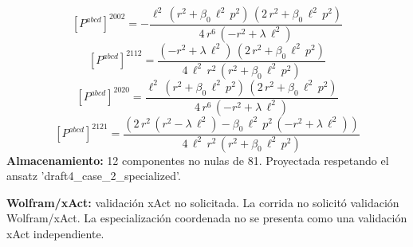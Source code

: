 \documentclass[11pt]{article}
\begin{document}
\begin{dmath*}[breakdepth={5}]
\left[P^{abcd}\right]^{2002} = -\frac{{\ell}^{2}\,\left({r}^{2} + \beta_{0}\,{\ell}^{2}\,{p}^{2}\right)\,\left(2\,{r}^{2} + \beta_{0}\,{\ell}^{2}\,{p}^{2}\right)}{4\,{r}^{6}\,\left(-{r}^{2} + \lambda\,{\ell}^{2}\right)}
\end{dmath*}
\begin{dmath*}[breakdepth={5}]
\left[P^{abcd}\right]^{2112} = \frac{\left(-{r}^{2} + \lambda\,{\ell}^{2}\right)\,\left(2\,{r}^{2} + \beta_{0}\,{\ell}^{2}\,{p}^{2}\right)}{4\,{\ell}^{2}\,{r}^{2}\,\left({r}^{2} + \beta_{0}\,{\ell}^{2}\,{p}^{2}\right)}
\end{dmath*}
\begin{dmath*}[breakdepth={5}]
\left[P^{abcd}\right]^{2020} = \frac{{\ell}^{2}\,\left({r}^{2} + \beta_{0}\,{\ell}^{2}\,{p}^{2}\right)\,\left(2\,{r}^{2} + \beta_{0}\,{\ell}^{2}\,{p}^{2}\right)}{4\,{r}^{6}\,\left(-{r}^{2} + \lambda\,{\ell}^{2}\right)}
\end{dmath*}
\begin{dmath*}[breakdepth={5}]
\left[P^{abcd}\right]^{2121} = \frac{\left(2\,{r}^{2}\,\left({r}^{2} - \lambda\,{\ell}^{2}\right) - \beta_{0}\,{\ell}^{2}\,{p}^{2}\,\left(-{r}^{2} + \lambda\,{\ell}^{2}\right)\right)}{4\,{\ell}^{2}\,{r}^{2}\,\left({r}^{2} + \beta_{0}\,{\ell}^{2}\,{p}^{2}\right)}
\end{dmath*}
\textbf{Almacenamiento:} 12 componentes no nulas de 81. Proyectada respetando el ansatz 'draft4\_case\_2\_specialized'.\par
\textbf{Wolfram/xAct:} validación xAct no solicitada. La corrida no solicitó validación Wolfram/xAct. La especialización coordenada no se presenta como una validación xAct independiente.\par\medskip
{}
\end{document}
